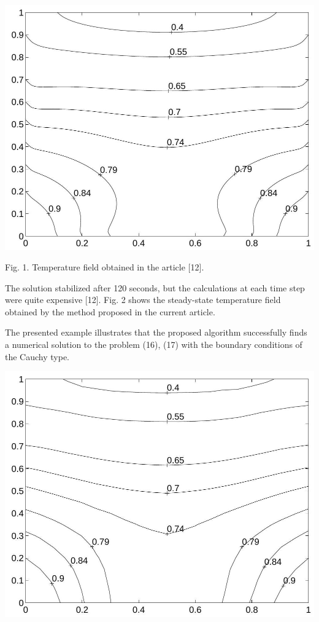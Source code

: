 \documentclass[10pt]{article}
\begin{document}
\begin{center}
\includegraphics[max width=\textwidth]{2022_12_28_417a2ab16b2d49239661g-10}
\end{center}

Fig. 1. Temperature field obtained in the article [12].

The solution stabilized after 120 seconds, but the calculations at each time step were quite expensive [12]. Fig. 2 shows the steady-state temperature field obtained by the method proposed in the current article.

The presented example illustrates that the proposed algorithm successfully finds a numerical solution to the problem (16), (17) with the boundary conditions of the Cauchy type.

\begin{center}
\includegraphics[max width=\textwidth]{2022_12_28_417a2ab16b2d49239661g-11}
\end{center}
\end{document}
